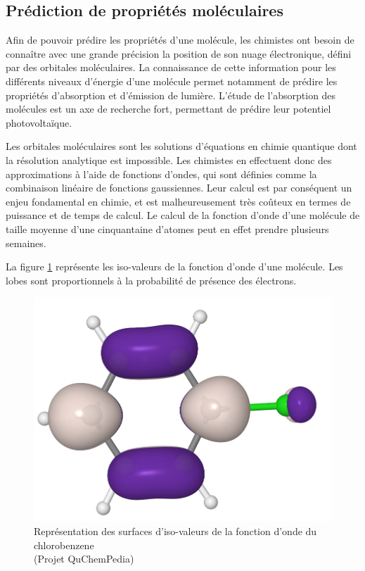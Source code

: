\label{opti_geom}

\subsection{Prédiction de propriétés moléculaires}

\par Afin de pouvoir prédire les propriétés d'une molécule, les chimistes ont besoin de connaître avec une grande précision la position de son nuage électronique, défini par des orbitales moléculaires. La connaissance de cette information pour les différents niveaux d'énergie d'une molécule permet notamment de prédire les propriétés d'absorption et d'émission de lumière. 
L'étude de l'absorption des molécules est un axe de recherche fort, permettant de prédire leur potentiel photovoltaïque.\\

\par Les orbitales moléculaires sont les solutions d'équations en chimie quantique dont la résolution analytique est impossible. Les chimistes en effectuent donc des approximations à l'aide de fonctions d'ondes, qui sont définies comme la combinaison linéaire de fonctions gaussiennes. Leur calcul est par conséquent un enjeu fondamental en chimie, et est malheureusement très coûteux en termes de puissance et de temps de calcul. Le calcul de la fonction d'onde d'une molécule de taille moyenne d'une cinquantaine d'atomes peut en effet prendre plusieurs semaines.\\

\par La figure \ref{orbitales} représente les iso-valeurs de la fonction d'onde d'une molécule. Les lobes sont proportionnels à la probabilité de présence des électrons.

\begin{figure}
	\centering
	\includegraphics[scale=0.25]{images/iso_niveaux.png}
	\caption{Représentation des surfaces d'iso-valeurs de la fonction d'onde du chlorobenzene\\ (Projet QuChemPedia)}
	\label{orbitales}
\end{figure}


